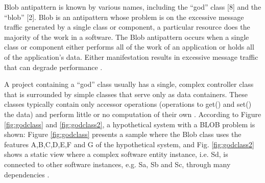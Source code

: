 \documentclass[espaco=umemeio,chapter=TITLE,twoside,openright]{abnt}
\begin{document}
Blob antipattern is known by various names, including the “god” class [8] and the “blob” [2]. Blob is an antipattern whose problem is on the excessive message traffic generated by a single class or component, a particular resource does the majority of the work in a software. The Blob antipattern occurs when a single class or component either performs all of the work of an application or holds all of the application’s data. Either manifestation results in excessive message traffic that can degrade performance \cite{Cortellessa2007} \cite{Smith2000}.

A project containing a “god” class usually has a single, complex controller class that is surrounded by simple classes that serve only as data containers. These classes typically contain only accessor operations (operations to get() and set() the data) and perform little or no computation of their own \cite{Smith2000}. According to Figure \ref{fig:godclass} and \ref{fig:godclass2}, a hypothetical system with a BLOB problem is shown: Figure \ref{fig:godclass} presents a sample where the Blob class uses the features A,B,C,D,E,F and G of the hypothetical system, and Fig. \ref{fig:godclass2} shows a static view where  a complex software entity instance, i.e. Sd, is connected to other software instances, e.g. Sa, Sb and Sc, through many dependencies \cite{Vetoio2011}\cite{Wert2013a}.
\end{document}
